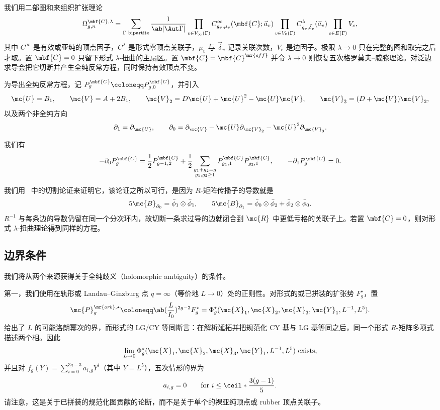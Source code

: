 我们用二部图和来组织扩张理论
\[ \Omega^{\mbf{C},\lambda}_{g,n} = \sum_{\Gamma \text{ bipartite}} \frac{1}{\ab|\Aut\Gamma|}\prod_{v\in V_{\infty}(\Gamma)} C^{\infty}_{g_v,\mu_v}(\mbf{C};\vec{a}_v) \prod_{v \in V_0(\Gamma)}C^{\lambda}_{g_v,\vec{\delta}_v}(\vec{a}_v)\prod_{e \in E(\Gamma)}V_e, \]
其中 \(C^{\infty}\) 是有效或亚纯的顶点因子，\(C^{\lambda}\) 是形式零顶点关联子，\(\mu_v\) 与 \(\vec{\delta}_v\) 记录关联次数，\(V_e\) 是边因子。极限 \(\lambda \to 0\) 只在完整的图和取完之后才取。置 \(\mbf{C}=0\) 只留下形式 \(\lambda\)-扭曲的主扇区。置 \(\mbf{C}=\mbf{C}^{\mr{eff}}\) 并令 \(\lambda\to0\) 则恢复五次格罗莫夫–威滕理论。对泛边求导会把它切断并产生全纯反常方程，同时保持有效顶点不变。

为导出全纯反常方程，记 \(P^{\mbf{C}}_g \coloneqq P^{\mbf{C}}_{g,0}\)，并引入
\[ \mc{U} = B_1, \qquad \mc{V} = A + 2B_1, \qquad \mc{V}_2 = D\mc{U} + \mc{U}^2 - \mc{U}\mc{V}, \qquad \mc{V}_3 = (D+\mc{V})\mc{V}_2, \]
以及两个非全纯方向
\[ \partial_1 = \partial_{\mc{U}}, \qquad \partial_0 = \partial_{\mc{V}} - \mc{U}\partial_{\mc{V}_2} - \mc{U}^2\partial_{\mc{V}_3}. \]

\begin{thm}
    我们有
    \[ -\partial_0 P^{\mbf{C}}_g = \frac{1}{2}P^{\mbf{C}}_{g-1,2} + \frac{1}{2}\sum_{\substack{g_1+g_2=g\\g_1,g_2\geq1}}P^{\mbf{C}}_{g_1,1}P^{\mbf{C}}_{g_2,1}, \qquad -\partial_1 P^{\mbf{C}}_g = 0. \]
\end{thm}

我们用~ 中的切割论证来证明它，该论证之所以可行，是因为 \(R\)-矩阵传播子的导数就是
\[ 5\mc{B}_{\partial_0} = \bar{\phi}_1 \otimes \bar{\phi}_1, \qquad 5\mc{B}_{\partial_1} = \bar{\phi}_0\otimes\bar{\phi}_2 + \bar{\phi}_2\otimes\bar{\phi}_0. \]
\(R^{-1}\) 与每条边的导数仍留在同一个分次环内，故切断一条求过导的边就闭合到 \(\mc{R}\) 中更低亏格的关联子上。若置 \(\mbf{C}=0\)，则对形式 \(\lambda\)-扭曲理论得到同样的方程。

\subsection{边界条件}%
\label{sub:Boundary conditions}

我们将从两个来源获得关于全纯歧义（holomorphic ambiguity）的条件。

第一，我们使用在轨形或 Landau--Ginzburg 点 \(q = \infty\)（等价地 \(L \to 0\)）处的正则性。对形式的或已拼装的扩张势 \(F_g^{\star}\)，置
\[ \mc{P}_g^{\mr{orb},\star} \coloneqq \ab(\frac{L}{I_0})^{2g-2}F_g^{\star} = \Phi_g^{\star}(\mc{X}_1,\mc{X}_2,\mc{X}_3,\mc{Y}_1,L^{-1},L^5). \]
 给出了 \(L\) 的可能洛朗幂次的界，而形式的 LG/CY 等同断言：在解析延拓并把规范化 CY 基与 LG 基等同之后，同一个形式 \(R\)-矩阵多项式描述两个相。因此
\[ \lim_{L\to0}\Phi_g^{\star}(\mc{X}_1,\mc{X}_2,\mc{X}_3,\mc{Y}_1,L^{-1},L^5) \text{ exists}, \]
并且对 \(f_g(Y) = \sum_{i=0}^{3g-3}a_{i,g}Y^i\)（其中 \(Y = L^5\)），五次情形的界为
\[ a_{i,g} = 0 \qquad \text{for } i \leq \ceil*{\frac{3(g-1)}{5}}. \]
请注意，这是关于已拼装的规范化图贡献的论断，而不是关于单个的裸亚纯顶点或 rubber 顶点关联子。

